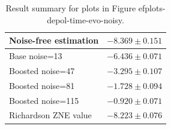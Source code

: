 \begin{table}
\caption{Result summary for plots in Figure 
ef{plots-depol-time-evo-noisy}.}
\begin{tabular*}{\textwidth}{@{\extracolsep{\fill}}ll@{}}
\toprule

Noise-free estimation & $-8.369 \pm 0.151$ \\
\midrule
Base noise=13 & $-6.436 \pm 0.071$ \\
Boosted noise=47 & $-3.295 \pm 0.107$ \\
Boosted noise=81 & $-1.728 \pm 0.094$ \\
Boosted noise=115 & $-0.920 \pm 0.071$ \\
\midrule
Richardson ZNE value & $-8.223 \pm 0.076$ \\
\bottomrule
\end{tabular*}
\label{table-depol-time-evo-noisy}
\end{table}
